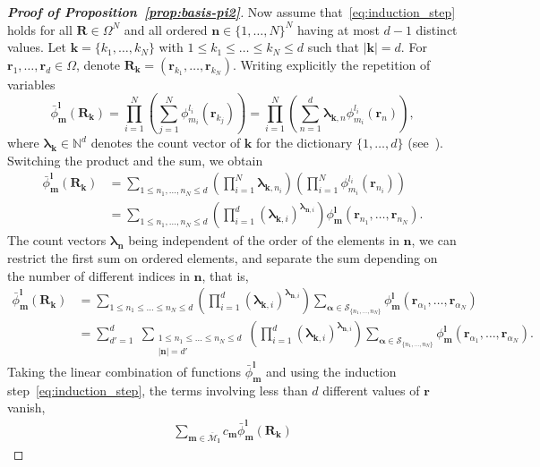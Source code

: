 \documentclass{article}
\newcommand{\blamb}[2]{\bm\lambda^{#1}_{#2}}
\newcommand{\bphi}[2]{\bar\phi^{#1}_{#2}}
\newcommand{\card}[1]{|{#1}|}
\numberwithin{equation}{section}
\def\N{\mathbb{N}}
\def\br{{\bm r}}
\def\bk{{\bm k}}
\def\bl{{\bm l}}
\def\bbm{{\bm m}}
\def\bn{{\bm n}}
\def\bR{{\bm R}}
\def\calM{\mathcal{M}}
\def\calS{\mathcal{S}}
\def\oMl{\overline{\calM}_\bl}
\def\Nat{{N}}
\begin{document}
\begin{proof}[\bf{Proof of Proposition~\ref{prop:basis-pi2}}]
Now assume that~\eqref{eq:induction_step} holds for all $\bR\in\Omega^\Nat$ and all ordered $\bn\in\{1,\ldots,\Nat\}^\Nat$ having at most $d-1$ distinct values.
Let $\bk = \{k_1,\ldots,k_\Nat\}$ with $1\le k_1\le\ldots\le k_{\Nat}\le d$ such that $\card{\bk}=d$. 
For $\br_1,\ldots, \br_{d} \in \Omega$, denote $\bR_{\bk}=(\br_{k_1},\ldots,\br_{k_{\Nat}})$. Writing explicitly the repetition of variables
\[
  \bphi{\bl}{\bbm}(\bR_{\bk})=\prod_{i=1}^\Nat\left(\sum_{j=1}^{\Nat}\phi^{l_i}_{m_i}\left(\br_{k_j}\right)\right)=\prod_{i=1}^\Nat\left(\sum_{n=1}^{d}\blamb{}{\bk,n}\phi^{l_i}_{m_i}\left(\br_{n}\right)\right),
\]
where $\blamb{}{\bk} \in \N^{d}$ denotes the count vector of $\bk$ for the dictionary $\{1,\ldots,d\}$ (see~\cite[Supplementary lecture H]{Kozen2007-ot}).  
Switching the product and the sum, we obtain 
\begin{align*}
    \bphi{\bl}{\bbm}(\bR_{\bk})&=
    \displaystyle\sum_{1\le n_1,\ldots,n_\Nat\le d}\left(\prod_{i=1}^\Nat \blamb{}{\bk,n_i}\right)\left(\prod_{i=1}^\Nat\phi^{l_i}_{m_i}\left(\br_{{n_i}}\right)\right)\\
    &=
    \displaystyle\sum_{1\le n_1,\ldots,n_\Nat\le d}
    \left(\prod_{i=1}^{d} (\blamb{}{\bk,i})^{\blamb{}{\bn,i}}\right)
    \phi^\bl_\bbm\left(\br_{n_{1}},\ldots,\br_{{n_\Nat}}\right).
\end{align*}
The count vectors $\blamb{}{\bn}$ being independent of the order of the elements in $\bn$, 
we can restrict the first sum on ordered elements, and separate the sum depending on the number of different indices in $\bn$, that is,
\begin{align*}
      \bphi{\bl}{\bbm}(\bR_{\bk})&=
      \displaystyle\sum_{1\le n_1\le\ldots\le n_\Nat\le d}\left(\prod_{i=1}^{d} (\blamb{}{\bk,i})^{\blamb{}{\bn,i}}\right)\sum_{\bm{\alpha}\in \calS_{\{n_1,\ldots,n_\Nat\}}}\phi^\bl_\bbm
    (\br_{\alpha_1}, \ldots, \br_{\alpha_\Nat}) \\
    &= \displaystyle
    \sum_{d' = 1}^d \;
    \sum_{\substack{1\le n_1\le\ldots\le n_\Nat\le d\\\card{\bn}=d'}}\left(\prod_{i=1}^{d} (\blamb{}{\bk,i})^{\blamb{}{\bn,i}}\right)
    \sum_{\bm{\alpha}\in \calS_{\{n_1,\ldots,n_\Nat\}}}\phi^\bl_\bbm
    (\br_{\alpha_1}, \ldots, \br_{\alpha_\Nat}).
\end{align*}
Taking the linear combination of functions $\bphi{\bl}{\bbm}$  and using the induction step~\eqref{eq:induction_step}, the terms involving less than $d$ different values of $\br$ vanish,
\begin{align*}
    \displaystyle\sum_{\bbm \in\oMl}c_\bbm\bphi{\bl}{\bbm}(\bR_{\bk})

\end{align*}
\end{proof}
\end{document}
